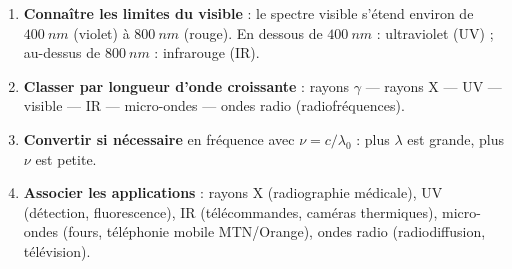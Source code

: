 \documentclass[11pt]{article}
\newcommand{\cle}[1]{{\popxbold\color{popdark}#1}}
\begin{document}
\begin{methode}
\begin{enumerate}
\item \textbf{Connaître les limites du visible} : le spectre visible s'étend environ de $\SI{400}{nm}$ (violet) à $\SI{800}{nm}$ (rouge). En dessous de $\SI{400}{nm}$ : \cle{ultraviolet} (UV) ; au-dessus de $\SI{800}{nm}$ : \cle{infrarouge} (IR).
\item \textbf{Classer par longueur d'onde croissante} : rayons $\gamma$ — rayons X — UV — visible — IR — micro-ondes — ondes radio (radiofréquences).
\item \textbf{Convertir si nécessaire} en fréquence avec $\nu = c/\lambda_0$ : plus $\lambda$ est grande, plus $\nu$ est petite.
\item \textbf{Associer les applications} : rayons X (radiographie médicale), UV (détection, fluorescence), IR (télécommandes, caméras thermiques), micro-ondes (fours, téléphonie mobile MTN/Orange), ondes radio (radiodiffusion, télévision).
\end{enumerate}
\end{methode}
\end{document}
